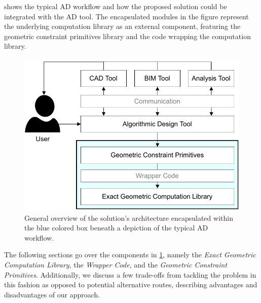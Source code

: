  shows the typical \ac{AD} workflow and how the proposed
solution could be integrated with the \ac{AD} tool.  The encapsulated modules in
the figure represent the underlying computation library as an external
component, featuring the geometric constraint primitives library and the code
wrapping the computation library.

\begin{figure}[htb]
  \includegraphics[width=\textwidth]{fig/solution-arch}
  \caption[Solution architecture within AD workflow]{
    General overview of the solution's architecture encapsulated within the
    blue colored box beneath a depiction of the typical \ac{AD} workflow.}%
  \label{fig:solution.arch}
\end{figure}

\newcommand{\geomlibrary}{\textit{Exact Geometric Computation Library}}
\newcommand{\wrapper}{\textit{Wrapper Code}}
\newcommand{\primitives}{\textit{Geometric Constraint Primitives}}

The following sections go over the components in \cref{fig:solution.arch},
namely the \geomlibrary, the \wrapper, and the \primitives.  Additionally, we
discuss a few trade-offs from tackling the problem in this fashion as opposed to
potential alternative routes, describing advantages and disadvantages of our
approach.



